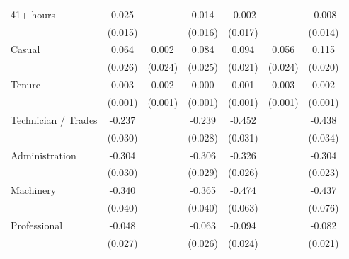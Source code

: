 {\begin{tabular}{l*{6}{c}}
41+ hours           &       0.025         &                     &       0.014         &      -0.002         &                     &      -0.008         \\
                    &     (0.015)         &                     &     (0.016)         &     (0.017)         &                     &     (0.014)         \\
Casual              &       0.064\sym{**} &       0.002         &       0.084\sym{***}&       0.094\sym{***}&       0.056\sym{**} &       0.115\sym{***}\\
                    &     (0.026)         &     (0.024)         &     (0.025)         &     (0.021)         &     (0.024)         &     (0.020)         \\
Tenure              &       0.003\sym{**} &       0.002\sym{**} &       0.000         &       0.001         &       0.003\sym{***}&       0.002\sym{**} \\
                    &     (0.001)         &     (0.001)         &     (0.001)         &     (0.001)         &     (0.001)         &     (0.001)         \\
Technician / Trades &      -0.237\sym{***}&                     &      -0.239\sym{***}&      -0.452\sym{***}&                     &      -0.438\sym{***}\\
                    &     (0.030)         &                     &     (0.028)         &     (0.031)         &                     &     (0.034)         \\
Administration      &      -0.304\sym{***}&                     &      -0.306\sym{***}&      -0.326\sym{***}&                     &      -0.304\sym{***}\\
                    &     (0.030)         &                     &     (0.029)         &     (0.026)         &                     &     (0.023)         \\
Machinery           &      -0.340\sym{***}&                     &      -0.365\sym{***}&      -0.474\sym{***}&                     &      -0.437\sym{***}\\
                    &     (0.040)         &                     &     (0.040)         &     (0.063)         &                     &     (0.076)         \\
Professional        &      -0.048\sym{*}  &                     &      -0.063\sym{**} &      -0.094\sym{***}&                     &      -0.082\sym{***}\\
                    &     (0.027)         &                     &     (0.026)         &     (0.024)         &                     &     (0.021)         \\

\end{tabular}}
